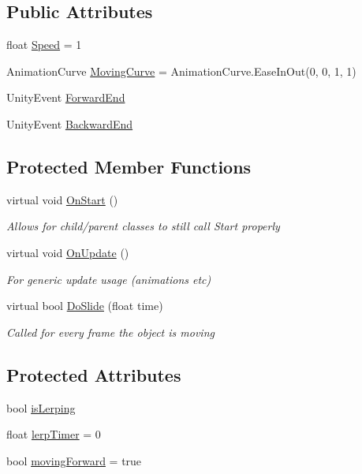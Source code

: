 \subsection*{Public Attributes}
\begin{DoxyCompactItemize}
\item 
float \mbox{\hyperlink{class_moving_object_a2430d5f8025716d6363ed0098f869604}{Speed}} = 1
\item 
Animation\+Curve \mbox{\hyperlink{class_moving_object_a8c09cee080e7bc79f13f0efef14ff544}{Moving\+Curve}} = Animation\+Curve.\+Ease\+In\+Out(0, 0, 1, 1)
\item 
Unity\+Event \mbox{\hyperlink{class_moving_object_a4a63d850725f5e7e2f2ac3b9ab24d3d3}{Forward\+End}}
\item 
Unity\+Event \mbox{\hyperlink{class_moving_object_a0de14b03f3e49dad9b1904313d801f93}{Backward\+End}}
\end{DoxyCompactItemize}
\subsection*{Protected Member Functions}
\begin{DoxyCompactItemize}
\item 
virtual void \mbox{\hyperlink{class_moving_object_a17c2c8f8e720dc68bf25c0abc59bf5f9}{On\+Start}} ()
\begin{DoxyCompactList}\small\item\em Allows for child/parent classes to still call Start properly \end{DoxyCompactList}\item 
virtual void \mbox{\hyperlink{class_moving_object_a81a2c65568d818f0f3a43c7e37b4fd02}{On\+Update}} ()
\begin{DoxyCompactList}\small\item\em For generic update usage (animations etc) \end{DoxyCompactList}\item 
virtual bool \mbox{\hyperlink{class_moving_object_a3ee062f4d319649a0006bc58a9d7a620}{Do\+Slide}} (float time)
\begin{DoxyCompactList}\small\item\em Called for every frame the object is moving \end{DoxyCompactList}\end{DoxyCompactItemize}
\subsection*{Protected Attributes}
\begin{DoxyCompactItemize}
\item 
bool \mbox{\hyperlink{class_moving_object_aecd5303443cf8969680edd8bffa34983}{is\+Lerping}}
\item 
float \mbox{\hyperlink{class_moving_object_aa38641f63fcfb4328378d7d34944b970}{lerp\+Timer}} = 0
\item 
bool \mbox{\hyperlink{class_moving_object_a9d2e223a1ea594a5fbec6e79387c1d3c}{moving\+Forward}} = true
\end{DoxyCompactItemize}


